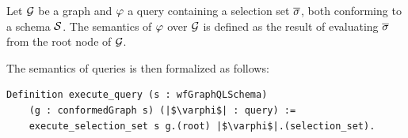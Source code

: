 \begin{definition}
Let $\mathcal{G}$ be a graph and $\varphi$ a query containing a selection set $\overline{\sigma}$, both conforming to a schema $\mathcal{S}$. The semantics of $\varphi$ over $\mathcal{G}$ is defined as the result of evaluating $\overline{\sigma}$ from the root node of $\mathcal{G}$.
\end{definition}

The semantics of queries is then formalized as follows:
\begin{verbatim}
Definition execute_query (s : wfGraphQLSchema)
    (g : conformedGraph s) (|$\varphi$| : query) :=
    execute_selection_set s g.(root) |$\varphi$|.(selection_set).
\end{verbatim}







